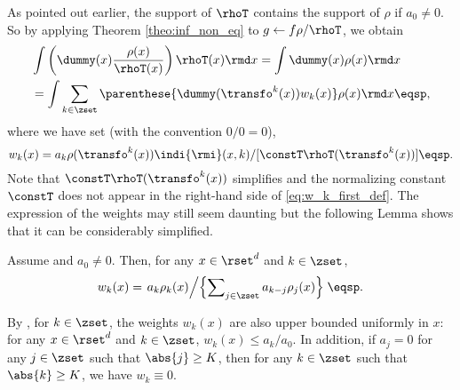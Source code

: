 As pointed out earlier, the support of $\rhoT$ contains the support of $\rho$ if $a_0 \neq 0$. So by applying Theorem \ref{theo:inf_non_eq} to $g \leftarrow f \rho /\rhoT$, we obtain 
\begin{align}
\label{eq:key-relation}
&\int \left(\dummy(x) \frac{\rho(x)}{\rhoT(x)}\right) \rhoT(x)  \rmd x =
\int \dummy(x) \rho(x)  \rmd x\\
&=\int \sum_{k\in \zset}  \parenthese{\dummy(\transfo^{k}(x)) w_k(x)} \rho(x)  \rmd x \eqsp,
\end{align}
where we have set (with the convention $0/0=0$), 
\begin{equation}
\label{eq:w_k_first_def}
w_k(x) = a_{k}  \rho(\transfo^{k}(x))\indi{\rmi}(x,k) / [\constT\rhoT(\transfo^{k}(x))]  \eqsp.
\end{equation}
Note that $\constT\rhoT(\transfo^{k}(x))$ simplifies and the
normalizing constant $\constT$ does not appear in the right-hand
side of \eqref{eq:w_k_first_def}. The expression of the weights may
still seem daunting but the following Lemma shows that it can be
considerably simplified.
\begin{lemma}
\label{SPlemma:weights}
Assume  and $a_0 \neq 0$.  Then, for any $x \in \rset^d$ and $k \in \zset$,
\begin{equation}
  \label{eq:def_w_k}
    w_{k}(x) =  \left. a_{k} \rho_k(x) \middle / \left\{ \sum\nolimits_{j\in \zset} a_{k-j} \rho_{j}(x) \right\} \right. \eqsp.
\end{equation}
\end{lemma}
By ,  for $k \in \zset$, the weights $w_{k}(x)$ are also upper bounded uniformly in $x$: for any $x \in \rset^d$ and $k \in \zset$,  $w_{k}(x) \leq a_{k}/a_0$. In addition,
if $a_j = 0$ for any $j\in \zset$ such that $\abs{j} \geq K$, then for any $k \in \zset$ such that $\abs{k} \geq K$, we have $w_k \equiv 0$. 

